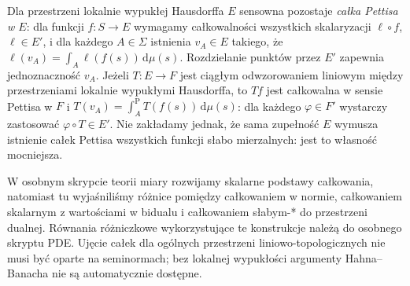\begin{uwaga}
\label{rem:lcs-pettis15b}
Dla przestrzeni lokalnie wypukłej Hausdorffa $E$ sensowna
pozostaje \emph{całka Pettisa w $E$}: dla funkcji $f:S\to E$
wymagamy całkowalności wszystkich skalaryzacji $\ell\circ f$,
$\ell\in E'$, i dla każdego $A\in\Sigma$ istnienia $v_A\in E$
takiego, że $\ell(v_A)=\int_A\ell(f(s))\,\mathrm d\mu(s)$.
Rozdzielanie punktów przez $E'$ zapewnia jednoznaczność
$v_A$. Jeżeli $T:E\to F$ jest ciągłym odwzorowaniem liniowym
między przestrzeniami lokalnie wypukłymi Hausdorffa,
to $Tf$ jest całkowalna w sensie Pettisa w $F$ i
$T(v_A)=\int_A^{\mathrm P} T(f(s))\,\mathrm d\mu(s)$:
dla każdego $\varphi\in F'$ wystarczy zastosować
$\varphi\circ T\in E'$. Nie zakładamy jednak, że sama
zupełność $E$ wymusza istnienie całek Pettisa wszystkich
funkcji słabo mierzalnych: jest to własność mocniejsza.
\end{uwaga}

\begin{uwaga}
W osobnym skrypcie teorii miary rozwijamy skalarne podstawy
całkowania, natomiast tu wyjaśniliśmy różnice pomiędzy
całkowaniem w normie, całkowaniem skalarnym z wartościami
w bidualu i całkowaniem słabym-* do przestrzeni dualnej.
Równania różniczkowe wykorzystujące te konstrukcje należą
do osobnego skryptu PDE. Ujęcie całek dla ogólnych przestrzeni
liniowo-topologicznych nie musi być oparte na seminormach;
bez lokalnej wypukłości argumenty Hahna--Banacha nie są
automatycznie dostępne.
\end{uwaga}

\addtocounter{section}{-1}
\endgroup
